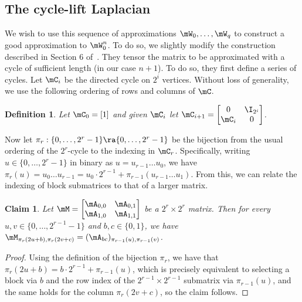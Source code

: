 \documentclass[11pt]{article}
\newtheorem{claim}[theorem]{Claim}
\newtheorem{definition}[theorem]{Definition}
\begin{document}
\subsection{The cycle-lift Laplacian}
We wish to use this sequence of approximations $\mW_0,\ldots,\mW_q$ to construct a good approximation to $\mW_0^n$. To do so, we slightly modify the construction described in Section 6 of~\cite{AhmadinejadKeMuPeSiVa19}. They tensor the matrix to be approximated with a cycle of sufficient length (in our case $n+1$). To do so, they first define a series of cycles. Let $\mC_i$ be the directed cycle on $2^i$ vertices. Without loss of generality, we use the following ordering of rows and columns of $\mC$.

\begin{definition}
Let $\mC_0=[1]$ and given $\mC_i$ let $\mC_{i+1}=\begin{bmatrix}0&\I_{2^i}\\ \mC_{i}&0\end{bmatrix}$.
\end{definition}
Now let $\pi_r:\{0,\ldots,2^r-1\}\ra\{0,\ldots,2^r-1\}$ be the bijection from the usual ordering of the $2^r$-cycle to the indexing in $\mC_r$. Specifically, writing $u\in \{0,\ldots,2^{r}-1\}$ in binary as $u=u_{r-1}\ldots u_0$, we have $\pi_r(u)=u_0\ldots u_{r-1}=u_0\cdot 2^{r-1}+\pi_{r-1}(u_{r-1}\ldots u_1)$. From this, we can relate the indexing of block submatrices to that of a larger 
matrix. %
\begin{claim}\label{clm:indexStruct}
Let $\mM=\begin{bmatrix}\mA_{0,0} & \mA_{0,1}\\ \mA_{1,0} & \mA_{1,1}\end{bmatrix}$ be a $2^r\times 2^r$ matrix. Then for every $u,v\in \{0,\ldots,2^{r-1}-1\}$ and $b,c\in \{0,1\}$, we have $\mM_{\pi_r(2u+b),\pi_r(2v+c)}=(\mA_{bc})_{\pi_{r-1}(u),\pi_{r-1}(v)}$.
\end{claim}
\begin{proof}
Using the definition of the bijection $\pi_r$, we have that $\pi_r(2u+b)=b\cdot 2^{r-1}+\pi_{r-1}(u)$, which is precisely equivalent to selecting a block via $b$ and the row index of the $2^{r-1}\times 2^{r-1}$ submatrix via $\pi_{r-1}(u)$, and the same holds for the column $\pi_r(2v+c)$, so the claim follows.
\end{proof}
\end{document}
